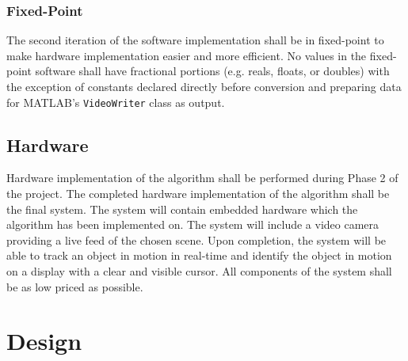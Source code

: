 \documentclass[12pt]{article} %
\begin{document}
\subsubsection{Fixed-Point}
The second iteration of the software implementation shall be in fixed-point to make hardware implementation easier and more efficient. No values in the fixed-point software shall have fractional portions (e.g. reals, floats, or doubles) with the exception of constants declared directly before conversion and preparing data for MATLAB's \texttt{VideoWriter} class as output.
\subsection{Hardware}
Hardware implementation of the algorithm shall be performed during Phase 2 of the project. The completed hardware implementation of the algorithm shall be the final system. The system will contain embedded hardware which the algorithm has been implemented on. The system will include a video camera providing a live feed of the chosen scene. Upon completion, the system will be able to track an object in motion in real-time and identify the object in motion on a display with a clear and visible cursor. All components of the system shall be as low priced as possible.
\section{Design}
\end{document}
